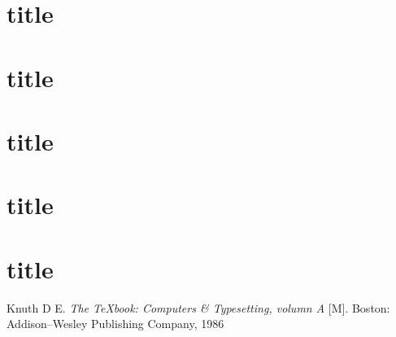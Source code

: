 \documentclass[twoside]{fduthesis}
\begin{document}
\section{title}
\section{title}
\section{title}
\section{title}
\section{title}

\begin{thebibliography}{9}
Knuth D E.
\newblock \textit{The \TeX book: Computers \& Typesetting, volumn A} [M].
\newblock Boston: Addison--Wesley Publishing Company, 1986
\end{thebibliography}
\end{document}
